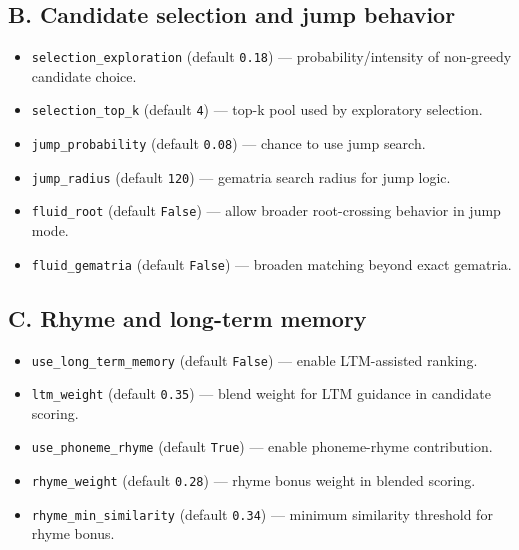 \documentclass[11pt,a4paper]{article}
\begin{document}
\subsection*{B. Candidate selection and jump behavior}
\begin{itemize}
  \item \texttt{selection\_exploration} (default \texttt{0.18}) --- probability/intensity of non-greedy candidate choice.
  \item \texttt{selection\_top\_k} (default \texttt{4}) --- top-k pool used by exploratory selection.
  \item \texttt{jump\_probability} (default \texttt{0.08}) --- chance to use jump search.
  \item \texttt{jump\_radius} (default \texttt{120}) --- gematria search radius for jump logic.
  \item \texttt{fluid\_root} (default \texttt{False}) --- allow broader root-crossing behavior in jump mode.
  \item \texttt{fluid\_gematria} (default \texttt{False}) --- broaden matching beyond exact gematria.
\end{itemize}

\subsection*{C. Rhyme and long-term memory}
\begin{itemize}
  \item \texttt{use\_long\_term\_memory} (default \texttt{False}) --- enable LTM-assisted ranking.
  \item \texttt{ltm\_weight} (default \texttt{0.35}) --- blend weight for LTM guidance in candidate scoring.
  \item \texttt{use\_phoneme\_rhyme} (default \texttt{True}) --- enable phoneme-rhyme contribution.
  \item \texttt{rhyme\_weight} (default \texttt{0.28}) --- rhyme bonus weight in blended scoring.
  \item \texttt{rhyme\_min\_similarity} (default \texttt{0.34}) --- minimum similarity threshold for rhyme bonus.
\end{itemize}
\end{document}

